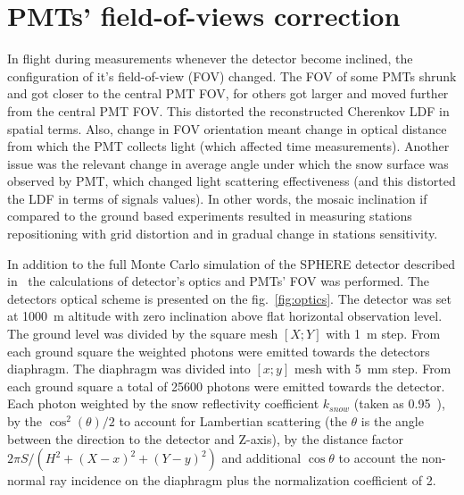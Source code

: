 \documentclass[final,5p,times,twocolumn]{elsarticle}
\begin{document}
\section{PMTs' field-of-views correction}

In flight during measurements whenever the detector become inclined, the configuration of it's field-of-view (FOV) changed. The FOV of some PMTs shrunk and got closer to the central PMT FOV, for others got larger and moved further from the central PMT FOV. This distorted the reconstructed Cherenkov LDF in spatial terms. Also, change in FOV orientation meant change in optical distance from which the PMT collects light (which affected time measurements). Another issue was the relevant change in average angle under which the snow surface was observed by PMT, which changed light scattering effectiveness (and this distorted the LDF in terms of signals values). In other words, the mosaic inclination if compared to the ground based experiments resulted in measuring stations repositioning with grid distortion and in gradual change in stations sensitivity.

In addition to the full Monte Carlo simulation of the SPHERE detector described in~\cite{Ant19} the calculations of detector's optics and PMTs' FOV was performed. The detectors optical scheme is presented on the fig.~\ref{fig:optics}. %
The detector was set at 1000~m altitude with zero inclination above flat horizontal observation level. The ground level was divided by the square mesh $[X;Y]$ with 1~m step. From each ground square the weighted photons were emitted towards the detectors diaphragm. The diaphragm was divided into $[x;y]$ mesh with 5~mm step. From each ground square a total of 25600 photons were emitted towards the detector. Each photon weighted by the snow reflectivity coefficient $k_{snow}$ (taken as 0.95~\cite{war82}), by the $\cos^2(\theta)/2$ to account for Lambertian scattering (the $\theta$ is the angle between the direction to the detector and Z-axis), by the distance factor $2\pi{}S/(H^2+(X-x)^2+(Y-y)^2)$ and additional $\cos\theta$ to account the non-normal ray incidence on the diaphragm {\color{red}plus} the normalization coefficient of 2.
\end{document}

